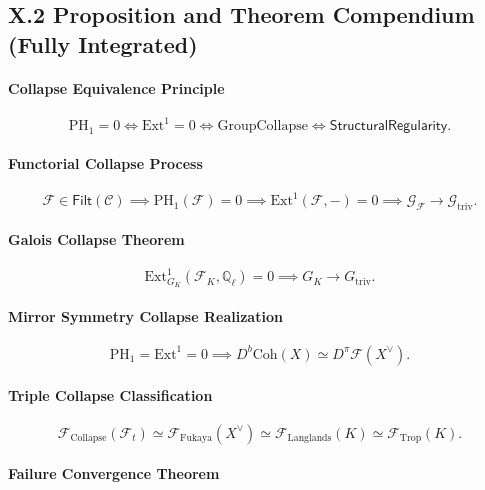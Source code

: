 \documentclass[11pt]{article}
\begin{document}
\subsection*{X.2 Proposition and Theorem Compendium (Fully Integrated)}

\paragraph{Collapse Equivalence Principle}

\[
\mathrm{PH}_1 = 0 \iff \mathrm{Ext}^1 = 0 \iff \mathrm{GroupCollapse} \iff \mathsf{StructuralRegularity}.
\]

\paragraph{Functorial Collapse Process}

\[
\mathcal{F} \in \mathsf{Filt}(\mathcal{C}) \implies
\mathrm{PH}_1(\mathcal{F}) = 0 \implies \mathrm{Ext}^1(\mathcal{F}, -) = 0 \implies \mathcal{G}_{\mathcal{F}} \longrightarrow \mathcal{G}_{\mathrm{triv}}.
\]

\paragraph{Galois Collapse Theorem}

\[
\mathrm{Ext}^1_{G_K}(\mathcal{F}_K, \mathbb{Q}_\ell) = 0 \implies
G_K \longrightarrow G_{\mathrm{triv}}.
\]

\paragraph{Mirror Symmetry Collapse Realization}

\[
\mathrm{PH}_1 = \mathrm{Ext}^1 = 0 \implies
D^b\mathrm{Coh}(X) \simeq D^\pi\mathcal{F}(X^\vee).
\]

\paragraph{Triple Collapse Classification}

\[
\mathcal{F}_{\mathrm{Collapse}}(\mathcal{F}_t) \simeq
\mathcal{F}_{\mathrm{Fukaya}}(X^\vee) \simeq \mathcal{F}_{\mathrm{Langlands}}(K) \simeq \mathcal{F}_{\mathrm{Trop}}(K).
\]

\paragraph{Failure Convergence Theorem}
\end{document}
